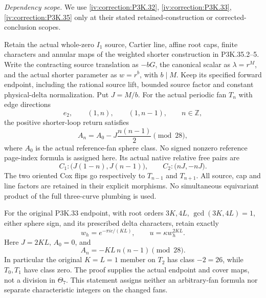 \begin{theorem}\hypertarget{tag-02VE}{}\label{night:P3K.67}

\par\noindent\textit{Dependency scope.} We use \cref{iv:correction:P3K.32}, \cref{iv:correction:P3K.33}, \cref{iv:correction:P3K.35} only at their stated retained-construction or corrected-conclusion scopes.



Retain the actual whole-zero \(I_1\) source, Cartier line, affine
root caps, finite characters and annular maps of the weighted shorter
construction in P3K.35.2--5. Write the contracting source translation
as \(-bG\), the canonical scalar as \(\lambda=r^M\), and the actual
shorter parameter as \(w=r^b\), with \(b\mid M\). Keep its specified
forward endpoint, including the rational source lift, bounded source
factor and constant physical-delta normalization. Put \(J=M/b\).
For the actual periodic fan \(T_n\) with edge directions
\[
                 e_2,\qquad (1,n),\qquad(1,n-1),
                         \qquad n\in\mathbb Z,
\]
the positive shorter-loop return satisfies
\[
 A_n=A_0-J\frac{n(n-1)}2\pmod{28},
 \tag{P3K.67.0}
\]
where \(A_0\) is the actual reference-fan sphere class. No signed
nonzero reference page-index formula is assigned here.
Its actual native relative free pairs are
\[
 C_1:\bigl(J(1-n),J(n-1)\bigr),\qquad
 C_2:\bigl(nJ,-nJ\bigr).
\]
The two oriented Cox flips go respectively to \(T_{n-1}\) and
\(T_{n+1}\). All source, cap and line factors are retained in their
explicit morphisms. No simultaneous equivariant product of the full
three-curve plumbing is used.

For the original P3K.33 endpoint, with root orders \(3K,4L\),
\(\gcd(3K,4L)=1\), either sphere sign, and its prescribed delta
characters, retain exactly
\[
 w_h=e^{-\pi ic/(KL)},\qquad u=\kappa w_h^{2KL}.
\]
Here \(J=2KL\), \(A_0=0\), and
\[
                       A_n=-KL\,n(n-1)\pmod{28}.
\]
In particular the original \(K=L=1\) member on \(T_2\) has class
\(-2=26\), while \(T_0,T_1\) have class zero. The proof supplies
the actual endpoint and cover maps, not a division in \(\Theta_7\).
This statement assigns neither an arbitrary-fan formula nor separate
characteristic integers on the changed fans.
\end{theorem}

